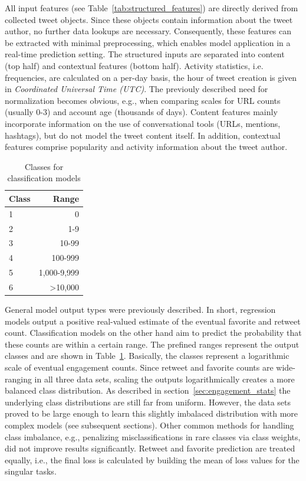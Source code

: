 All input features (see Table~\ref{tab:structured_features}) are directly derived
from collected tweet objects.
Since these objects contain information about the tweet author, no further data lookups
are necessary.
Consequently, these features can be extracted with minimal preprocessing, which
enables model application in a real-time prediction setting.
The structured inputs are separated into content (top half) and contextual
features (bottom half).
Activity statistics, i.e. frequencies, are calculated on a per-day basis,
the hour of tweet creation is given in \textit{Coordinated Universal Time (UTC)}.
The previouly described need for normalization becomes obvious, e.g., when
comparing scales for URL counts (usually 0-3) and account age (thousands of days).
Content features mainly incorporate information on the use of conversational
tools (URLs, mentions, hashtags), but do not model the tweet content itself.
In addition, contextual features comprise popularity and activity information
about the tweet author.

\begin{table}
  \begin{tabular}{lr}
    \toprule
    Class & Range \\
    \midrule
    1 & 0 \\
    2 & 1-9 \\
    3 & 10-99 \\
    4 & 100-999 \\
    5 & 1,000-9,999 \\
    6 & >10,000 \\
    \bottomrule
  \end{tabular}
  \caption{Classes for classification models}
  \label{tab:classification_buckets}
\end{table}

General model output types were previously described.
In short, regression models output a positive real-valued estimate of the
eventual favorite and retweet count.
Classification models on the other hand aim to predict the probability that
these counts are within a certain range.
The prefined ranges represent the output classes and are shown in Table~\ref{tab:classification_buckets}.
Basically, the classes represent a logarithmic scale of eventual engagement counts.
Since retweet and favorite counts are wide-ranging in all three data sets,
scaling the outputs logarithmically creates a more balanced class distribution.
As described in section~\ref{sec:engagement_stats} the underlying class distributions
are still far from uniform.
However, the data sets proved to be large enough to learn this slightly 
imbalaced distribution with more complex models (see subsequent sections).
Other common methods for handling class imbalance, e.g., penalizing misclassifications
in rare classes via class weights, did not improve results significantly.
Retweet and favorite prediction are treated equally, i.e., the final loss
is calculated by building the mean of loss values for the singular tasks.

